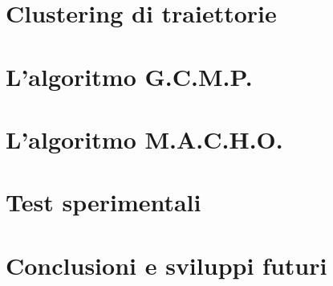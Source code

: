 \documentclass[%
  a4paper,                %
  12pt,                   %
  twoside,                %
  openright,              %
  titlepage,              %
  final                   %
]{scrbook}
\begin{document}
  \frontmatter{}
  \pagestyle{empty}
  
  
  
  
  \tableofcontents

  \mainmatter{}
  \pagestyle{headings}

  \chapter{Clustering di traiettorie}\label{chapter:chapter1}
  

  \chapter{L'algoritmo G.C.M.P.}\label{chapter:chapter2}
  

  \chapter{L'algoritmo M.A.C.H.O.}\label{chapter:chapter3}
  

  \chapter{Test sperimentali}\label{chapter:chapter4}
  

  \chapter{Conclusioni e sviluppi futuri}\label{chapter:chapter5}
  

  \appendix
  

  \backmatter{}
  
  
\end{document}
